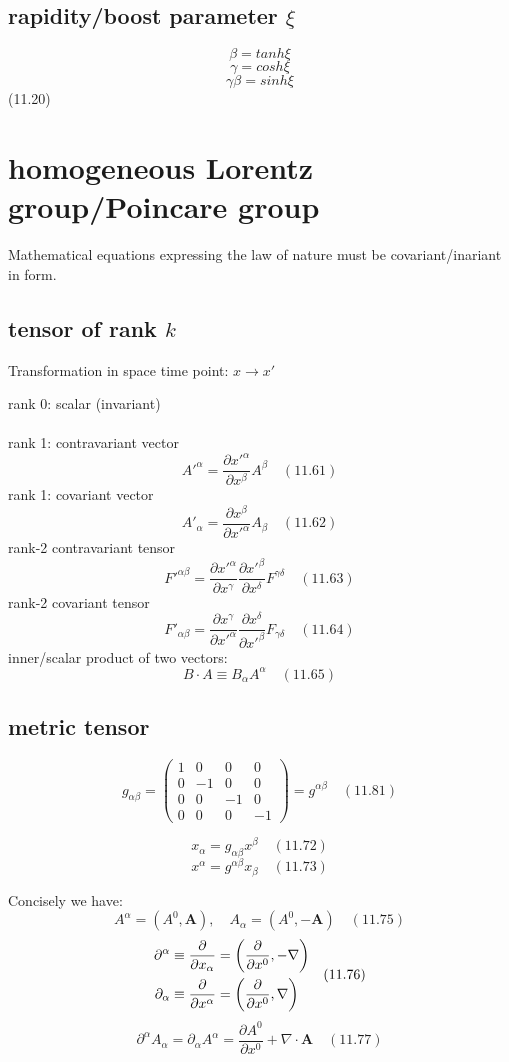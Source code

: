 \documentclass[10pt, oneside]{article}   	%
\begin{document}
\begin{multicols}{2}
\subsection{rapidity/boost parameter $\xi$}
$$\beta=tanh \xi$$
$$\gamma=cosh\xi$$
$$\gamma\beta=sinh\xi$$
(11.20)

\section{homogeneous Lorentz group/Poincare group}
Mathematical equations expressing the law of nature must be covariant/inariant in form.
\subsection{tensor of rank $k$}
Transformation in space time point: $x\rightarrow x'$

rank 0: scalar (invariant) \\  
\\
rank 1: contravariant vector\\
$$A'^\alpha=\frac{\partial x'^\alpha}{\partial x^\beta}A^\beta \quad (11.61)$$
rank 1: covariant vector\\
$$A'_\alpha=\frac{\partial x^\beta}{\partial x'^\alpha}A_\beta \quad (11.62)$$
rank-2 contravariant tensor\\
$$F'^{\alpha \beta}=\frac{\partial x'^{\alpha}}{\partial x^{\gamma}} \frac{\partial x'^{\beta}}{\partial x^{\delta}} F^{\gamma \delta} \quad(11.63)$$
rank-2 covariant tensor\\
$$F'_{\alpha \beta}=\frac{\partial x^{\gamma}}{\partial x'^{\alpha}} \frac{\partial x^{\delta}}{\partial x'^{\beta}} F_{\gamma \delta} \quad(11.64)$$
inner/scalar product of two vectors:
$$B\cdot A\equiv B_\alpha A^\alpha \quad (11.65)$$
\subsection{metric tensor}
$$g_{\alpha\beta}=
\begin{pmatrix} 
1 & 0 & 0 & 0 \\
0 & -1 & 0 & 0 \\
0 & 0 & -1 & 0 \\
0 & 0 & 0 & -1
\end{pmatrix}=g^{\alpha\beta} \quad(11.81)$$

$$x_\alpha=g_{\alpha\beta}x^\beta \quad(11.72)$$
$$x^\alpha=g^{\alpha\beta}x_\beta \quad(11.73)$$

Concisely we have:
$$A^{\alpha}=\left(A^{0}, \mathbf{A}\right), \quad A_{\alpha}=\left(A^{0},-\mathbf{A}\right)\quad (11.75)$$
$$\begin{aligned} \partial^{\alpha} & \equiv \frac{\partial}{\partial x_{\alpha}}=\left(\frac{\partial}{\partial x^{0}},-\nabla\right) \\
\partial_{\alpha} & \equiv \frac{\partial}{\partial x^{\alpha}}=\left(\frac{\partial}{\partial x^{0}}, \nabla\right) \end{aligned}\\
\quad(11.76) 
$$
$$\partial^{\alpha} A_{\alpha}=\partial_{\alpha} A^{\alpha}=\frac{\partial A^{0}}{\partial x^{0}}+\nabla \cdot \mathbf{A}\quad (11.77)$$


\end{multicols}
\end{document}
